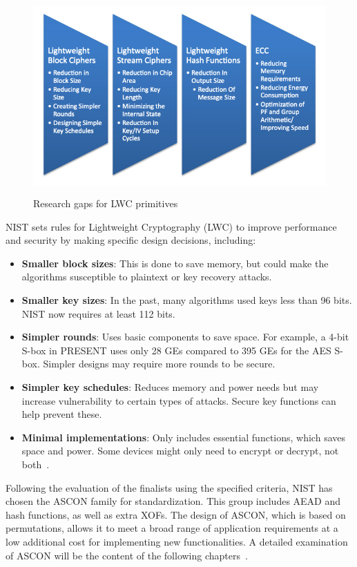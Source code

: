 \begin{figure}[h]
    \centering
    \includegraphics[width=12cm, height=7.5cm]{media/Research_gaps.png}
    \caption{Research gaps for LWC primitives}
    \label{fig:Research_gaps}
\end{figure}

NIST sets rules for Lightweight Cryptography (LWC) to improve performance and security by making specific design decisions, including:

\begin{itemize}
    \item \textbf{Smaller block sizes}: This is done to save memory, but could make the algorithms susceptible to plaintext or key recovery attacks.
    \item \textbf{Smaller key sizes}: In the past, many algorithms used keys less than 96 bits. NIST now requires at least 112 bits.
    \item \textbf{Simpler rounds}: Uses basic components to save space. For example, a 4-bit S-box in PRESENT uses only 28 GEs compared to 395 GEs for the AES S-box. Simpler designs may require more rounds to be secure.
    \item \textbf{Simpler key schedules}: Reduces memory and power needs but may increase vulnerability to certain types of attacks. Secure key functions can help prevent these.
    \item \textbf{Minimal implementations}: Only includes essential functions, which saves space and power. Some devices might only need to encrypt or decrypt, not both~\cite{mckay2016report}.
\end{itemize}

Following the evaluation of the finalists using the specified criteria, NIST has chosen the ASCON family for standardization. This group includes AEAD and hash functions, as well as extra XOFs. The design of ASCON, which is based on permutations, allows it to meet a broad range of application requirements at a low additional cost for implementing new functionalities. A detailed examination of ASCON will be the content of the following chapters~\cite{turan2021status}.


